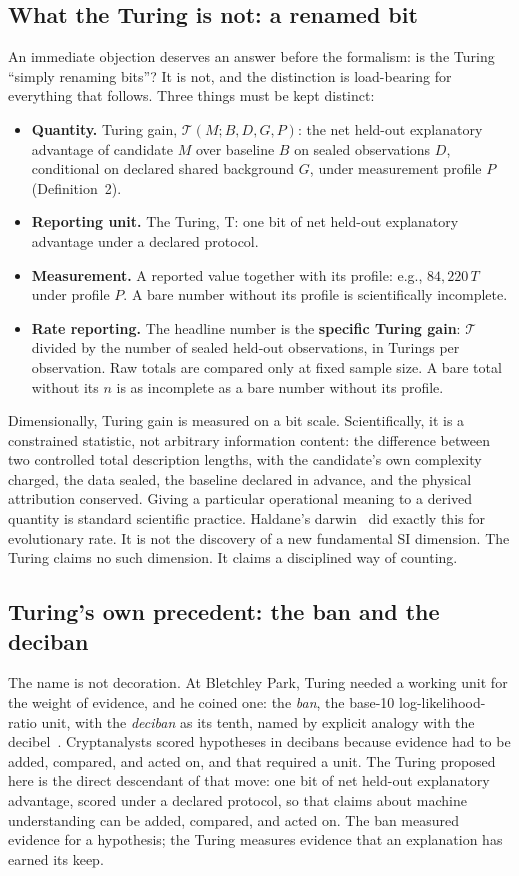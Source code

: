 \documentclass[11pt]{article}
\begin{document}
\subsection{What the Turing is not: a renamed bit}

An immediate objection deserves an answer before the formalism: is the Turing ``simply renaming bits''? It is not, and the distinction is load-bearing for everything that follows. Three things must be kept distinct:
\begin{itemize}
\item \textbf{Quantity.} Turing gain, \(\mathcal{T}(M;B,D,G,P)\): the net held-out explanatory advantage of candidate \(M\) over baseline \(B\) on sealed observations \(D\), conditional on declared shared background \(G\), under measurement profile \(P\) (Definition~2).
\item \textbf{Reporting unit.} The Turing, T: one bit of net held-out explanatory advantage under a declared protocol.
\item \textbf{Measurement.} A reported value together with its profile: e.g., \(84{,}220\,T\) under profile \(P\). A bare number without its profile is scientifically incomplete.
\item \textbf{Rate reporting.} The headline number is the \textbf{specific Turing gain}: \(\mathcal{T}\) divided by the number of sealed held-out observations, in Turings per observation. Raw totals are compared only at fixed sample size. A bare total without its \(n\) is as incomplete as a bare number without its profile.
\end{itemize}
Dimensionally, Turing gain is measured on a bit scale. Scientifically, it is a constrained statistic, not arbitrary information content: the difference between two controlled total description lengths, with the candidate's own complexity charged, the data sealed, the baseline declared in advance, and the physical attribution conserved. Giving a particular operational meaning to a derived quantity is standard scientific practice. Haldane's darwin~\cite{haldane1949} did exactly this for evolutionary rate. It is not the discovery of a new fundamental SI dimension. The Turing claims no such dimension. It claims a disciplined way of counting.

\subsection{Turing's own precedent: the ban and the deciban}

The name is not decoration. At Bletchley Park, Turing needed a working unit for the weight of evidence, and he coined one: the \textit{ban}, the base-10 log-likelihood-ratio unit, with the \textit{deciban} as its tenth, named by explicit analogy with the decibel~\cite{good1979}. Cryptanalysts scored hypotheses in decibans because evidence had to be added, compared, and acted on, and that required a unit. The Turing proposed here is the direct descendant of that move: one bit of net held-out explanatory advantage, scored under a declared protocol, so that claims about machine understanding can be added, compared, and acted on. The ban measured evidence for a hypothesis; the Turing measures evidence that an explanation has earned its keep.
\end{document}
